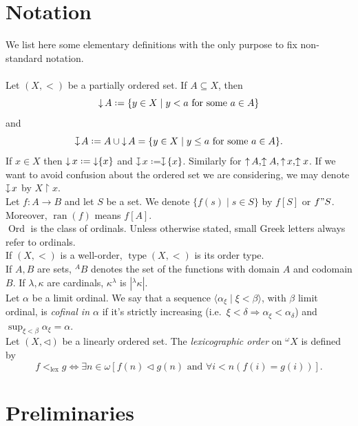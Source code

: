 \documentclass[11pt,a4paper]{report}
\theoremstyle{definition}
\theoremstyle{num.custom-title}
\theoremstyle{custom-title}
\DeclareMathOperator{\ran}{ran}
\DeclareMathOperator{\Ord}{\text{Ord}}
\DeclareMathOperator{\imp}{\Rightarrow}
\DeclareMathOperator{\sse}{\subseteq}
\DeclareMathOperator{\type}{type}
\DeclareMathOperator{\restr}{\upharpoonright}
\DeclareMathOperator{\down}{\downarrow}
\DeclareMathOperator{\up}{\uparrow}
\newcommand{\downmapsto}{%
           \mathrel{\raisebox{.1em}{%
							\rotatebox[origin=c]{-90}{$\mapsto$}}}}
\newcommand{\upmapsto}{%
           \mathrel{\raisebox{.08em}{%
							\rotatebox[origin=c]{90}{$\mapsto$}}}}
\newcommand*{\defeq}{\mathrel{\rlap{%
                     \raisebox{0.3ex}{$\cdot$}}%
                     \raisebox{-0.3ex}{$\cdot$}}%
                     =}
\renewcommand{\iff}{\Leftrightarrow}
\begin{document}
\chapter*{Notation}

We list here some elementary definitions with the only purpose to fix non-standard notation.\\
\\
Let $(X,<)$ be a partially ordered set. If $A \sse X$, then 
\[
\down A \defeq \{y \in X \mid y < a \text{ for some } a \in A \}
\]
and 
\[
\downmapsto A \defeq A \cup \down A = \{y \in X \mid y \leq a \text{ for some } a \in A \}.
\]
If $x \in X$ then $\down x \defeq \down \{x\}$ and $\downmapsto x \defeq \downmapsto \{x\}$. Similarly for $\up A, \upmapsto A, \up x, \upmapsto x$. If we want to avoid confusion about the ordered set we are considering, we may denote $\downmapsto x$ by $X \restr x$.\\
Let $f \colon A \to B$ and let $S$ be a set. We denote $\{f(s) \mid s \in S\}$ by $f[S]$ or $f"S$. Moreover, $\ran(f)$ means $f[A]$.\\
$\Ord$ is the class of ordinals. Unless otherwise stated, small Greek letters always refer to ordinals.\\
If $(X,<)$ is a well-order, $\type (X,<)$ is its order type.\\
If $A,B$ are sets, ${}^A B$ denotes the set of the functions with domain $A$ and codomain $B$. If $\lambda, \kappa$ are cardinals, $\kappa^\lambda$ is $|{}^\lambda \kappa|$.\\
Let $\alpha$ be a limit ordinal. We say that a sequence $\langle \alpha_\xi \mid \xi < \beta \rangle$, with $\beta$ limit ordinal, is \emph{cofinal in $\alpha$} if it's strictly increasing (i.e.\ $\xi < \delta \imp \alpha_\xi < \alpha_\delta$) and $\sup_{\xi < \beta} \alpha_\xi = \alpha$.\\
Let $(X,\lhd)$ be a linearly ordered set. The \emph{lexicographic order} on $^{\omega} X$ is defined by
\[
f <_{\text{lex}} g \iff \exists n \in \omega [f(n) \lhd g(n) \text{ and } \forall i < n (f(i)=g(i))].
\]




\chapter*{Preliminaries}
\end{document}
